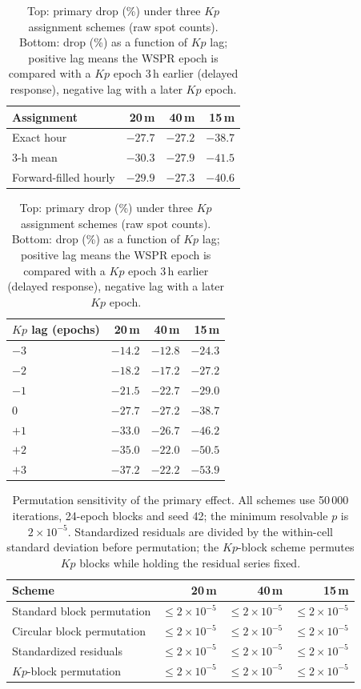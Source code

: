 \documentclass{agujournal2019}
\begin{document}
\begin{table}[h]
	\centering
	\small
	\caption{Top: primary drop (\%) under three $Kp$ assignment schemes (raw spot counts).
		Bottom: drop (\%) as a function of $Kp$ lag; positive lag means the
		WSPR epoch is compared with a $Kp$ epoch 3\,h earlier (delayed
		response), negative lag with a later $Kp$ epoch.}
	\label{tab:merge}
	\begin{tabular}{lrrr}
		\toprule
		Assignment & 20\,m & 40\,m & 15\,m \\
		\midrule
		Exact hour              & $-27.7$ & $-27.2$ & $-38.7$ \\
		3-h mean                & $-30.3$ & $-27.9$ & $-41.5$ \\
		Forward-filled hourly   & $-29.9$ & $-27.3$ & $-40.6$ \\
		\bottomrule
	\end{tabular}

	\vspace{1.2ex}
	\begin{tabular}{lrrr}
		\toprule
		$Kp$ lag (epochs) & 20\,m & 40\,m & 15\,m \\
		\midrule
		$-3$ & $-14.2$ & $-12.8$ & $-24.3$ \\
		$-2$ & $-18.2$ & $-17.2$ & $-27.2$ \\
		$-1$ & $-21.5$ & $-22.7$ & $-29.0$ \\
		$0$  & $-27.7$ & $-27.2$ & $-38.7$ \\
		$+1$ & $-33.0$ & $-26.7$ & $-46.2$ \\
		$+2$ & $-35.0$ & $-22.0$ & $-50.5$ \\
		$+3$ & $-37.2$ & $-22.2$ & $-53.9$ \\
		\bottomrule
	\end{tabular}
\end{table}

\begin{table}[h]
	\centering
	\small
	\caption{Permutation sensitivity of the primary effect. All schemes use
		50\,000 iterations, 24-epoch blocks and seed 42; the minimum
		resolvable $p$ is $2 \times 10^{-5}$. Standardized residuals are
		divided by the within-cell standard deviation before permutation;
		the $Kp$-block scheme permutes $Kp$ blocks while holding the
		residual series fixed.}
	\label{tab:perm}
	\begin{tabular}{lrrr}
		\toprule
		Scheme & 20\,m & 40\,m & 15\,m \\
		\midrule
		Standard block permutation      & $\le 2\times10^{-5}$ & $\le 2\times10^{-5}$ & $\le 2\times10^{-5}$ \\
		Circular block permutation      & $\le 2\times10^{-5}$ & $\le 2\times10^{-5}$ & $\le 2\times10^{-5}$ \\
		Standardized residuals          & $\le 2\times10^{-5}$ & $\le 2\times10^{-5}$ & $\le 2\times10^{-5}$ \\
		$Kp$-block permutation          & $\le 2\times10^{-5}$ & $\le 2\times10^{-5}$ & $\le 2\times10^{-5}$ \\
		\bottomrule
	\end{tabular}
\end{table}
\end{document}
